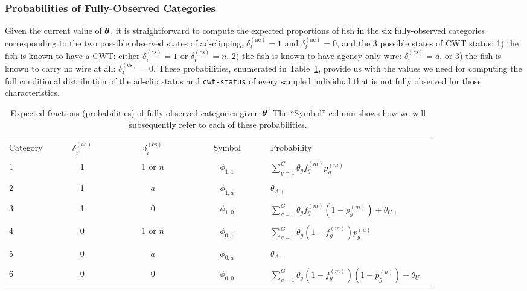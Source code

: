 \documentclass[11pt]{article}
\def\bm#1{\mathpalette\bmstyle{#1}}
\def\bmstyle#1#2{\mbox{\boldmath$#1#2$}}
\newcommand{\btheta}{\bm{\theta}}
\begin{document}
\subsubsection{Probabilities of Fully-Observed Categories}
Given the current value of $\btheta$, it is straightforward to compute the expected proportions of fish
in the six fully-observed categories corresponding to the two possible observed states of ad-clipping, 
$\delta_i^{(\mathrm{ac})} = 1$ and $\delta_i^{(\mathrm{ac})} = 0$, and the 3 possible states of CWT status:
1) the fish is known to have a CWT: either $\delta_i^{(\mathrm{cs})} = 1$ or $\delta_i^{(\mathrm{cs})} = n$, 2) the fish
is known to have agency-only wire: $\delta_i^{(\mathrm{cs})} = a$, or 3) the fish is known to carry no wire at all:
$\delta_i^{(\mathrm{cs})} = 0$. These probabilities, enumerated in Table~\ref{tab:probs}, provide us with the values
we need for computing the full conditional distribution of the ad-clip status and {\tt cwt-status} of every sampled individual
that is not fully observed for those characteristics.
\begin{table}
\caption{Expected fractions (probabilities) of fully-observed categories given $\btheta$.  The ``Symbol'' column shows
how we will subsequently refer to each of these probabilities. \label{tab:probs} }
\begin{center}
\begin{tabular}{lcccl}
\hline \hline\\
Category&~~~~~$\delta_i^{(\mathrm{ac})}$~~~~~      &      ~~~~~$\delta_i^{(\mathrm{cs})}$~~~~~     &     ~~~~~Symbol~~~~~   &   Probability \\\hline
\\
1 & 1 &  1 or $n$  &  $\phi_{1,1}$     &  $\sum_{g=1}^G \theta_g f_g^{(m)}  p_g^{(m)}$ \\
\\
2 & 1 &  $a$  &  $\phi_{1,a}$     &  $\theta_{A+}$ \\ 
\\
3 & 1 &  0  &  $\phi_{1,0}$     &  $\sum_{g=1}^G \theta_g f_g^{(m)}  (1 - p_g^{(m)}) + \theta_{U+}$  \\
\\
4 & 0 &  1 or $n$  &  $\phi_{0,1}$     &  $\sum_{g=1}^G \theta_g (1 - f_g^{(m)})  p_g^{(u)}$ \\
\\
5 & 0 &  $a$  &  $\phi_{0,a}$     &  $\theta_{A-}$ \\ 
\\
6 & 0 &  0  &  $\phi_{0,0}$     &  $\sum_{g=1}^G \theta_g  (1 - f_g^{(m)}) (1 - p_g^{(u)}) + \theta_{U-}$  \\
\hline\hline
\end{tabular}
\end{center}
\end{table}
\end{document}
